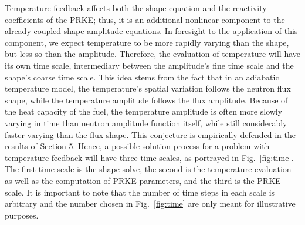 \documentclass{elsarticle}
\newcommand{\fig}[1]{Fig.~\ref{#1}}                      %
\begin{document}
Temperature feedback affects both the shape equation and the reactivity coefficients of the PRKE; thus, 
it is an additional nonlinear component to the already coupled shape-amplitude equations. In foresight to 
the application of this component, we expect temperature to be more rapidly varying than the shape, but 
less so than the amplitude.  Therefore, the evaluation of temperature will have its own time scale, intermediary
between the amplitude's fine time scale and the shape's coarse time scale. 
This idea stems from the fact that in an adiabatic temperature model, the temperature's spatial variation follows the neutron flux shape, while the temperature amplitude follows the flux amplitude. Because of the heat capacity of the fuel, the temperature amplitude is often more slowly varying in time than neutron amplitude function itself, while still considerably faster varying than the flux shape. This conjecture is empirically defended in the results of Section 5.
Hence, a possible solution process for a problem with temperature feedback will have three time scales, as
portrayed in \fig{fig:time}.  The first time scale is the shape solve, the second is the temperature evaluation 
as well as the computation of PRKE parameters, and the third is the PRKE scale.  It is important to note that the 
number of time steps in each scale is arbitrary and the number chosen in \fig{fig:time} are only meant for 
illustrative purposes.
\end{document}
